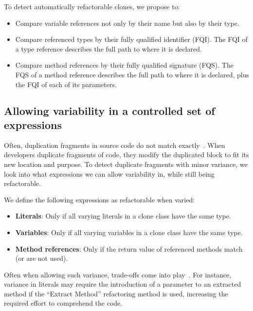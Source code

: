 \documentclass[]{IEEEtran}
\begin{document}
To detect automatically refactorable clones, we propose to:
\begin{itemize}
  \item Compare variable references not only by their name but also by their type.
  \item Compare referenced types by their fully qualified identifier (FQI). The FQI of a type reference describes the full path to where it is declared.
  \item Compare method references by their fully qualified signature (FQS). The FQS of a method reference describes the full path to where it is declared, plus the FQI of each of its parameters.
\end{itemize}

\subsection{Allowing variability in a controlled set of expressions} \label{sec:t2r}
Often, duplication fragments in source code do not match exactly~\cite{kodhai2013method}. When developers duplicate fragments of code, they modify the duplicated block to fit its new location and purpose. To detect duplicate fragments with minor variance, we look into what expressions we can allow variability in, while still being refactorable.

We define the following expressions as refactorable when varied:
\begin{itemize}
  \item \textbf{Literals}: Only if all varying literals in a clone class have the same type.
  \item \textbf{Variables}: Only if all varying variables in a clone class have the same type.
  \item \textbf{Method references}: Only if the return value of referenced methods match (or are not used).
\end{itemize}
Often when allowing such variance, trade-offs come into play~\cite{krishnan2013refactoring, krishnan2014unification}. For instance, variance in literals may require the introduction of a parameter to an extracted method if the ``Extract Method'' refactoring method is used, increasing the required effort to comprehend the code.
\end{document}
